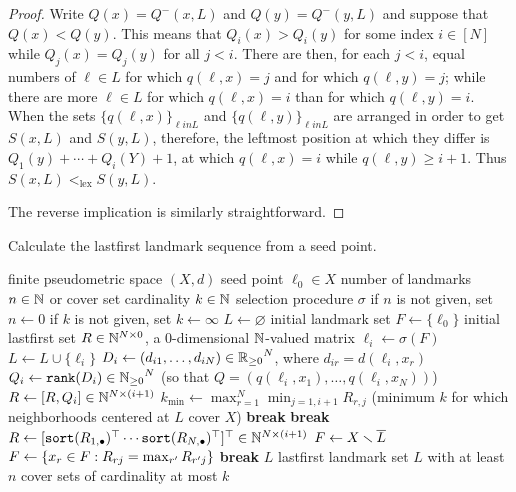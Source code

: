 \documentclass{article}
\begin{document}
\begin{proof}
Write $Q(x) = Q^-(x,L)$ and $Q(y) = Q^-(y,L)$ and suppose that $Q(x) < Q(y)$.
This means that $Q_i(x) > Q_i(y)$ for some index $i \in [N]$ while $Q_j(x) = Q_j(y)$ for all $j < i$.
There are then, for each $j < i$, equal numbers of $\ell \in L$ for which $q(\ell,x) = j$ and for which $q(\ell,y) = j$; while there are more $\ell \in L$ for which $q(\ell,x) = i$ than for which $q(\ell,y) = i$.
When the sets $\{ q(\ell,x) \}_{\ell in L}$ and $\{ q(\ell,y) \}_{\ell in L}$ are arranged in order to get $S(x,L)$ and $S(y,L)$, therefore, the leftmost position at which they differ is $Q_1(y) + \cdots + Q_i(Y) + 1$, at which $q(\ell,x) = i$ while $q(\ell,y) \geq i + 1$.
Thus $S(x,L) <_{\operatorname{lex}} S(y,L)$.

The reverse implication is similarly straightforward.
\end{proof}

\begin{algorithm}
\caption{Calculate the lastfirst landmark sequence from a seed point.}
\label{alg:lastfirst-landmarks}
\begin{algorithmic}[1]
\REQUIRE finite pseudometric space $(X,d)$
\REQUIRE seed point $\ell_0 \in X$
\REQUIRE number of landmarks $n \in \mathbb{N}$ or cover set cardinality $k \in \mathbb{N}$
\REQUIRE selection procedure $\sigma$
\STATE if $n$ is not given, set $n \leftarrow 0$
\label{line:n}
\STATE if $k$ is not given, set $k \leftarrow \infty$
\label{line:k}
\STATE $L \leftarrow \varnothing$ initial landmark set
\STATE $F \leftarrow \{ \ell_0 \}$ initial lastfirst set
\STATE $R \in \mathbb{N}^{N \times 0}$, a $0$-dimensional $\mathbb{N}$-valued matrix
    \STATE $\ell_i \leftarrow \sigma(F)$
    \STATE $L \leftarrow L \cup \{\ell_i\}$
    \STATE $D_i \leftarrow (d_{i1},\ldots,d_{iN}) \in {\mathbb{R}_{\geq 0}}^N$, where $d_{ir} = d(\ell_i, x_r)$
    \STATE $Q_i \leftarrow \verb|rank|(D_i) \in {\N_{\geq 0}}^N$ (so that $Q = (q(\ell_i, x_1),\ldots,q(\ell_i, x_N))$)
    \label{line:rank}
    \STATE $R \leftarrow [R, Q_i] \in \mathbb{N}^{N \times (i+1)}$
    \STATE $k_{\min} \leftarrow \max_{r=1}^{N}{ \min_{j=1,i+1}{ R_{r,j} } }$ (minimum $k$ for which neighborhoods centered at $L$ cover $X$)
    \label{line:kmin}
        \STATE \textbf{break}
        \label{line:nonempty}
    \ENDIF
        \STATE \textbf{break}
        \label{line:check}
    \ENDIF
    \STATE $R \leftarrow [ \verb|sort|({R_{1,\bullet}})^\top \cdots \verb|sort|({R_{N,\bullet}})^\top ]^\top \in \N^{N \times (i+1)}$
    \label{line:sort}
    \STATE $F \leftarrow X \smallsetminus \overline{L}$
    \label{line:maximize}
        \STATE $F \leftarrow \{x_r \in F : R_{rj} = \max_{r'}{R_{r'j}}\}$
        \label{line:lastfirst}
            \STATE \textbf{break}
        \ENDIF
    \ENDFOR
\ENDFOR
\RETURN $L$
\RETURN lastfirst landmark set $L$ with at least $n$ cover sets of cardinality at most $k$
\end{algorithmic}
\end{algorithm}
\end{document}
